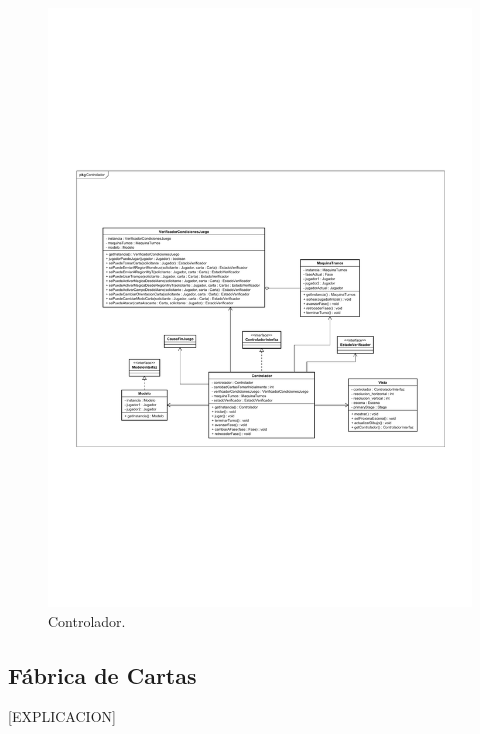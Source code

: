 \begin{figure}[H]
	\centering
	\includegraphics[scale=0.8]{includes/class_Controlador}
	\caption{Controlador.}
	\label{class_Controlador}
\end{figure}

\subsection{Fábrica de Cartas}

[EXPLICACION]


